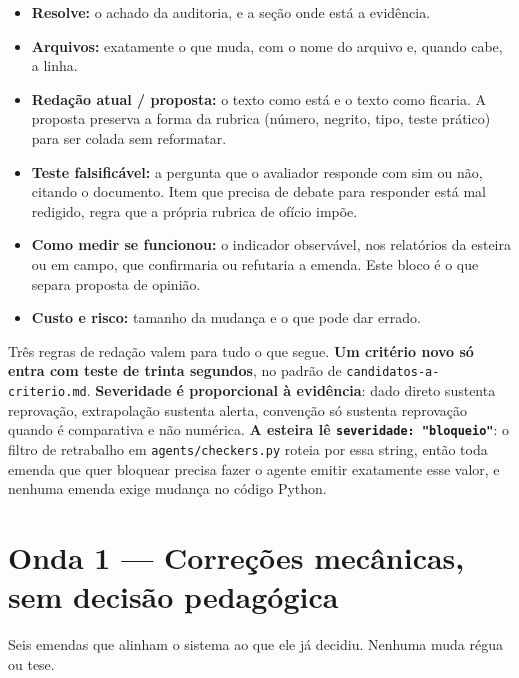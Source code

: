 \documentclass[11pt,a4paper]{article}
\begin{document}
\begin{itemize}
  \item \textbf{Resolve:} o achado da auditoria, e a seção onde está a evidência.
  \item \textbf{Arquivos:} exatamente o que muda, com o nome do arquivo e, quando cabe, a linha.
  \item \textbf{Redação atual / proposta:} o texto como está e o texto como ficaria. A proposta
        preserva a forma da rubrica (número, negrito, tipo, teste prático) para ser colada sem
        reformatar.
  \item \textbf{Teste falsificável:} a pergunta que o avaliador responde com sim ou não, citando o
        documento. Item que precisa de debate para responder está mal redigido, regra que a própria
        rubrica de ofício impõe.
  \item \textbf{Como medir se funcionou:} o indicador observável, nos relatórios da esteira ou em
        campo, que confirmaria ou refutaria a emenda. Este bloco é o que separa proposta de
        opinião.
  \item \textbf{Custo e risco:} tamanho da mudança e o que pode dar errado.
\end{itemize}

Três regras de redação valem para tudo o que segue. \textbf{Um critério novo só entra com teste
de trinta segundos}, no padrão de \texttt{candidatos-a-criterio.md}. \textbf{Severidade é
proporcional à evidência}: dado direto sustenta reprovação, extrapolação sustenta alerta,
convenção só sustenta reprovação quando é comparativa e não numérica. \textbf{A esteira lê
\texttt{severidade: "bloqueio"}}: o filtro de retrabalho em \texttt{agents/checkers.py} roteia
por essa string, então toda emenda que quer bloquear precisa fazer o agente emitir exatamente
esse valor, e nenhuma emenda exige mudança no código Python.

\section{Onda 1 --- Correções mecânicas, sem decisão pedagógica}

Seis emendas que alinham o sistema ao que ele já decidiu. Nenhuma muda régua ou tese.
\end{document}
